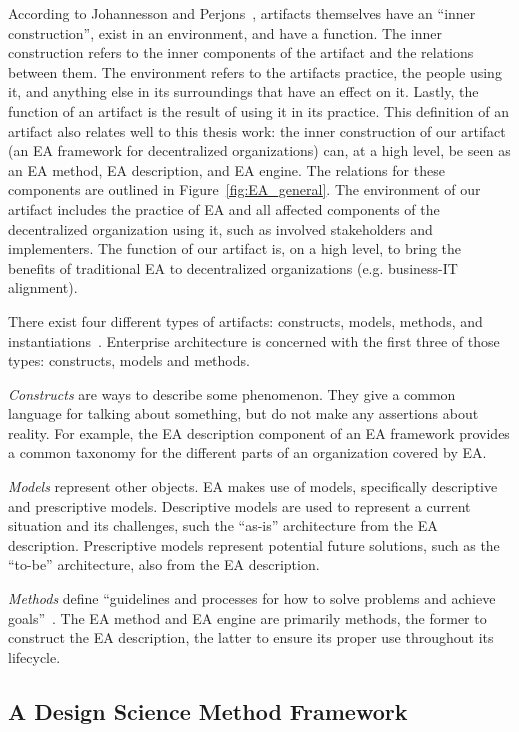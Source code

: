 According to Johannesson and Perjons~\cite[Ch. 1]{johannessonPerjons2012}, artifacts themselves have an ``inner construction'', exist in an environment, and have a function. The inner construction refers to the inner components of the artifact and the relations between them. The environment refers to the artifacts practice, the people using it, and anything else in its surroundings that have an effect on it. Lastly, the function of an artifact is the result of using it in its practice. This definition of an artifact also relates well to this thesis work: the inner construction of our artifact (an EA framework for decentralized organizations) can, at a high level, be seen as an EA method, EA description, and EA engine. The relations for these components are outlined in Figure~\ref{fig:EA_general}. The environment of our artifact includes the practice of EA and all affected components of the decentralized organization using it, such as involved stakeholders and implementers. The function of our artifact is, on a high level, to bring the benefits of traditional EA to decentralized organizations (e.g. business-IT alignment).

There exist four different types of artifacts: constructs, models, methods, and instantiations~\cite{hevner2004,johannessonPerjons2012}. Enterprise architecture is concerned with the first three of those types: constructs, models and methods. 

\textit{Constructs} are ways to describe some phenomenon. They give a common language for talking about something, but do not make any assertions about reality. For example, the EA description component of an EA framework provides a common taxonomy for the different parts of an organization covered by EA. 

\textit{Models} represent other objects. EA makes use of models, specifically descriptive and prescriptive models. Descriptive models are used to represent a current situation and its challenges, such the ``as-is'' architecture from the EA description. Prescriptive models represent potential future solutions, such as the ``to-be'' architecture, also from the EA description.

\textit{Methods} define ``guidelines and processes for how to solve problems and achieve goals''~\cite[Ch. 1]{johannessonPerjons2012}. The EA method and EA engine  are primarily methods, the former to construct the EA description, the latter to ensure its proper use throughout its lifecycle. 

\subsection{A Design Science Method Framework}
\label{sec:framework}

